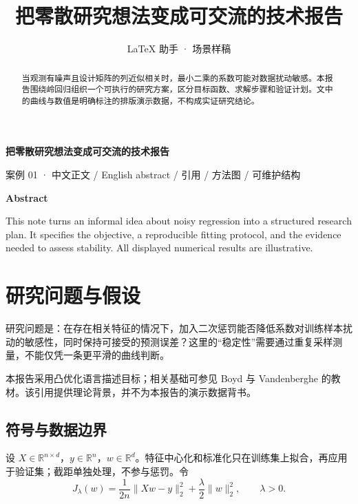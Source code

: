 \documentclass[UTF8,a4paper,11pt,fontset=fandol]{ctexart}
\title{把零散研究想法变成可交流的技术报告}
\author{LaTeX 助手 · 场景样稿}
\date{}
\newcommand{\tagline}[1]{{\small\sffamily\color{accent}#1}\par\medskip}
\begin{document}
\thispagestyle{fancy}\vspace*{3mm}\begin{center}{\LARGE\bfseries\color{ink}把零散研究想法变成可交流的技术报告}\par\vspace{4mm}{\small LaTeX 助手 · 场景样稿}\end{center}\vspace{3mm}

\tagline{案例 01 · 中文正文 / English abstract / 引用 / 方法图 / 可维护结构}
\begin{abstract}
当观测有噪声且设计矩阵的列近似相关时，最小二乘的系数可能对数据扰动敏感。本报告围绕岭回归组织一个可执行的研究方案，区分目标函数、求解步骤和验证计划。文中的曲线与数值是明确标注的排版演示数据，不构成实证研究结论。
\end{abstract}
\begin{center}\textbf{Abstract}\end{center}
\noindent This note turns an informal idea about noisy regression into a structured research plan. It specifies the objective, a reproducible fitting protocol, and the evidence needed to assess stability. All displayed numerical results are illustrative.
\section{研究问题与假设}
研究问题是：在存在相关特征的情况下，加入二次惩罚能否降低系数对训练样本扰动的敏感性，同时保持可接受的预测误差？这里的“稳定性”需要通过重复采样测量，不能仅凭一条更平滑的曲线判断。

本报告采用凸优化语言描述目标；相关基础可参见 Boyd 与 Vandenberghe 的教材\cite{boyd2004}。该引用提供理论背景，并不为本报告的演示数据背书。
\subsection{符号与数据边界}
设 $X\in\mathbb R^{n\times d}$，$y\in\mathbb R^n$，$w\in\mathbb R^d$。特征中心化和标准化只在训练集上拟合，再应用于验证集；截距单独处理，不参与惩罚。令
\begin{equation}
 J_\lambda(w)=\frac{1}{2n}\lVert Xw-y\rVert_2^2+\frac{\lambda}{2}\lVert w\rVert_2^2,\qquad\lambda>0.\label{eq:objective}
\end{equation}
\end{document}
